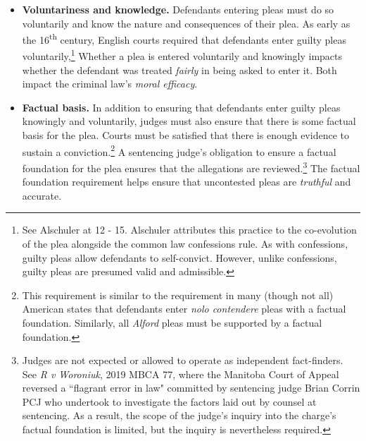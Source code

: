 \begin{itemize}
\item \textbf{Voluntariness and knowledge.} Defendants entering pleas must do so voluntarily and know the nature and consequences of their plea. As early as the 16\textsuperscript{th} century, English courts required that defendants enter guilty pleas voluntarily,\footnote{See Alschuler at 12 - 15. Alschuler attributes this practice to the co-evolution of the plea alongside the common law confessions rule. As with confessions, guilty pleas allow defendants to self-convict. However, unlike confessions, guilty pleas are presumed valid and admissible.} Whether a plea is entered voluntarily and knowingly impacts whether the defendant was treated \textit{fairly} in being asked to enter it. Both impact the criminal law's \textit{moral efficacy}.
\item \textbf{Factual basis.} In addition to ensuring that defendants enter guilty pleas knowingly and voluntarily, judges must also ensure that there is some factual basis for the plea. Courts must be satisfied that there is enough evidence to sustain a conviction.\footnote{This requirement is similar to the requirement in many (though not all) American states that defendants enter \textit{nolo contendere} pleas with a factual foundation. Similarly, all \textit{Alford} pleas must be supported by a factual foundation.} A sentencing judge's obligation to ensure a factual foundation for the plea ensures that the allegations are reviewed.\footnote{Judges are not expected or allowed to operate as independent fact-finders. See \textit{R v Woroniuk}, 2019 MBCA 77, where the Manitoba Court of Appeal reversed a ``flagrant error in law" committed by sentencing judge Brian Corrin PCJ who undertook to investigate the factors laid out by counsel at sentencing. As a result, the scope of the judge's inquiry into the charge's factual foundation is limited, but the inquiry is nevertheless required.} The factual foundation requirement helps ensure that uncontested pleas are \textit{truthful} and accurate.

\end{itemize}
